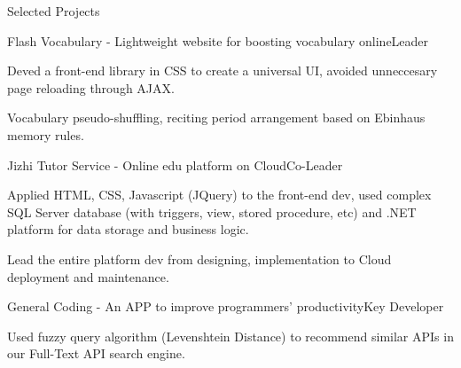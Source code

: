 \documentclass{resume} %
\begin{document}
\begin{rSection}{Selected Projects}
\begin{rSubsection}{Flash Vocabulary - Lightweight website for boosting vocabulary online}{Leader}{}{}
\item Deved a front-end library in CSS to create a universal UI, avoided unneccesary page reloading through AJAX.
\item Vocabulary pseudo-shuffling, reciting period arrangement based on Ebinhaus memory rules.
\end{rSubsection}


\begin{rSubsection}{Jizhi Tutor Service - Online edu platform on Cloud}{Co-Leader}{}{}
\item Applied HTML, CSS, Javascript (JQuery) to the front-end dev, used complex SQL Server database (with triggers, view, stored procedure, etc) and .NET platform for data storage and business logic.
\item Lead the entire platform dev from designing, implementation to Cloud deployment and maintenance.
\end{rSubsection}


\begin{rSubsection}{General Coding - An APP to improve programmers' productivity}{Key Developer}{}{}
\item Used fuzzy query algorithm (Levenshtein Distance) to recommend similar APIs in our Full-Text API search engine.
\end{rSubsection}


\end{rSection}

\end{document}
